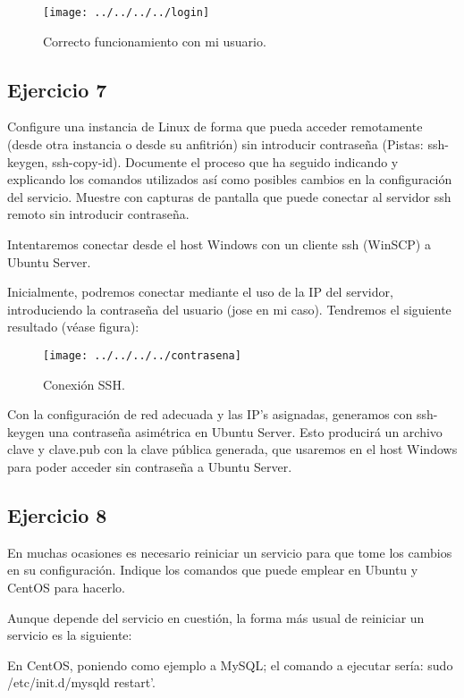 \documentclass[a4paper, 11pt]{article} %
\begin{document}
\pagebreak 

\begin{figure}[htpb]
\texttt{[image: ../../../../login]}
\caption{Correcto funcionamiento con mi usuario.}
\end{figure}


\subsection{Ejercicio 7}
Configure una instancia de Linux de forma que pueda acceder remotamente (desde otra instancia o desde su anfitrión) sin introducir contraseña (Pistas: ssh-keygen, ssh-copy-id). Documente el proceso que ha seguido indicando y explicando los comandos utilizados así como posibles cambios en la configuración del servicio. Muestre con capturas de pantalla que puede conectar al servidor ssh remoto sin introducir contraseña.

Intentaremos conectar desde el host Windows con un cliente ssh (WinSCP) a Ubuntu Server.

Inicialmente, podremos conectar mediante el uso de la IP del servidor, introduciendo la contraseña del usuario (jose en mi caso). Tendremos el siguiente resultado (véase figura): 

\pagebreak 

\begin{figure}[htpb]
\texttt{[image: ../../../../contrasena]}
\caption{Conexión SSH.}
\end{figure}


Con la configuración de red adecuada y las IP's asignadas, generamos con ssh-keygen una contraseña asimétrica en Ubuntu Server. Esto producirá un archivo clave y clave.pub con la clave pública generada, que usaremos en el host Windows para poder acceder sin contraseña a Ubuntu Server. 


\subsection{Ejercicio 8}
En muchas ocasiones es necesario reiniciar un servicio para que tome los cambios en su configuración. Indique los comandos que puede emplear en Ubuntu y CentOS para hacerlo.

Aunque depende del servicio en cuestión, la forma más usual de reiniciar un servicio es la siguiente: 

En CentOS, poniendo como ejemplo a MySQL; el comando a ejecutar sería: sudo /etc/init.d/mysqld restart'. 
\end{document}
